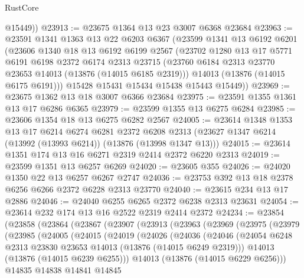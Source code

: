 \begin{lexlean}{RustCore}
\begin{coremodule}
        @15449))
@23913 := @23675 @1364 @13 @23 @3007 @6368 @23684
@23963 := @23591
    @1341
    @1363
    @13
    @22
    @6203
    @6367
    (@23599
      @1341
      @13
      @6192
      @6201
      (@23606
        @1340
        @18
        @13
        @6192
        @6199
        @2567
        (@23702
          @1280
          @13
          @17
          @5771
          @6191
          @6198
          @2372
          @6174
          @2313
          @23715
          (@23760 @6184 @2313 @23770 @23653 @14013 (@13876 (@14015 @6185 @2319)))
          @14013
          (@13876 (@14015 @6175 @6191)))
        @15428
        @15431
        @15434
        @15438
        @15443
        @15449))
@23969 := @23675 @1362 @13 @18 @3007 @6366 @23684
@23975 := @23591 @1355 @1361 @13 @17 @6286 @6365
@23979 := @23599 @1355 @13 @6275 @6284
@23985 := @23606 @1354 @18 @13 @6275 @6282 @2567
@24005 := @23614
    @1348
    @1353
    @13
    @17
    @6214
    @6274
    @6281
    @2372
    @6208
    @2313
    (@23627 @1347 @6214 (@13992 (@13993 @6214)) (@13876 (@13998 @1347 @13)))
@24015 := @23614 @1351 @174 @13 @16 @6271 @2319 @2414 @2372 @6220 @2313
@24019 := @23599 @1351 @13 @6257 @6269
@24020 := @23605 @355
@24026 := @24020 @1350 @22 @13 @6257 @6267 @2747
@24036 := @23753 @392 @13 @18 @2378 @6256 @6266 @2372 @6228 @2313 @23770
@24040 := @23615 @234 @13 @17 @2886
@24046 := @24040 @6255 @6265 @2372 @6238 @2313 @23631
@24054 := @23614 @232 @174 @13 @16 @2522 @2319 @2414 @2372
@24234 := @23854
    (@23858
      (@23864
        (@23867
          (@23907
            (@23913
              (@23963
                (@23969
                  (@23975
                    (@23979
                      (@23985
                        (@24005
                          (@24015
                            (@24019
                              (@24026
                                (@24036
                                  (@24046
                                    (@24054
                                      @6248
                                      @2313
                                      @23830
                                      @23653
                                      @14013
                                      (@13876 (@14015 @6249 @2319)))
                                    @14013
                                    (@13876 (@14015 @6239 @6255)))
                                  @14013
                                  (@13876 (@14015 @6229 @6256)))
                                @14835
                                @14838
                                @14841
                                @14845

\end{coremodule}
\end{lexlean}
